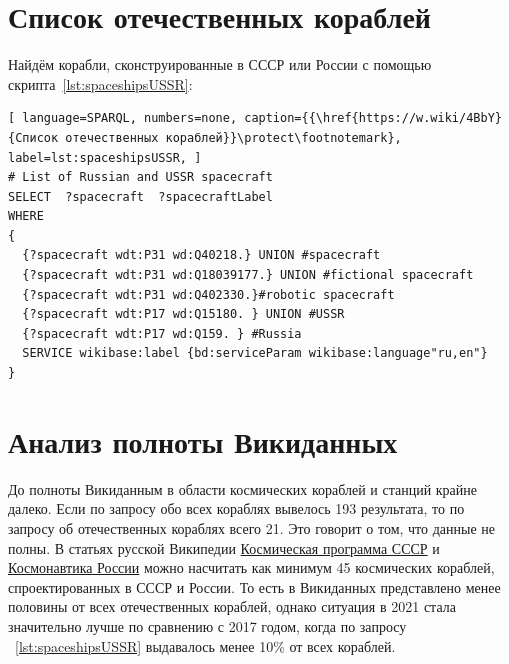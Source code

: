 \section{Список отечественных кораблей}
Найдём корабли, сконструированные в СССР или России с помощью скрипта~\ref{lst:spaceshipsUSSR}:

\begin{lstlisting}[ language=SPARQL, numbers=none, caption={{\href{https://w.wiki/4BbY}{Список отечественных кораблей}}\protect\footnotemark}, label=lst:spaceshipsUSSR, ]
# List of Russian and USSR spacecraft
SELECT  ?spacecraft  ?spacecraftLabel 
WHERE
{
  {?spacecraft wdt:P31 wd:Q40218.} UNION #spacecraft
  {?spacecraft wdt:P31 wd:Q18039177.} UNION #fictional spacecraft
  {?spacecraft wdt:P31 wd:Q402330.}#robotic spacecraft
  {?spacecraft wdt:P17 wd:Q15180. } UNION #USSR
  {?spacecraft wdt:P17 wd:Q159. } #Russia
  SERVICE wikibase:label {bd:serviceParam wikibase:language"ru,en"}
}
\end{lstlisting}

\section{Анализ полноты Викиданных}
До полноты Викиданным в области космических кораблей и станций крайне далеко. Если по запросу обо всех кораблях вывелось 193 результата, то по запросу об отечественных кораблях всего 21. Это говорит о том, что данные не полны. В статьях русской Википедии \href{https://ru.wikipedia.org/wiki/%D0%9A%D0%BE%D1%81%D0%BC%D0%B8%D1%87%D0%B5%D1%81%D0%BA%D0%B0%D1%8F_%D0%BF%D1%80%D0%BE%D0%B3%D1%80%D0%B0%D0%BC%D0%BC%D0%B0_%D0%A1%D0%A1%D0%A1%D0%A0}{Космическая программа СССР} и \href{https://ru.wikipedia.org/wiki/%D0%9A%D0%BE%D1%81%D0%BC%D0%BE%D0%BD%D0%B0%D0%B2%D1%82%D0%B8%D0%BA%D0%B0_%D0%A0%D0%BE%D1%81%D1%81%D0%B8%D0%B8}{Космонавтика России} можно насчитать как минимум 45 космических кораблей, спроектированных в СССР и России. То есть в Викиданных представлено менее половины от всех отечественных кораблей, однако ситуация в 2021 стала значительно лучше по сравнению с 2017 годом, когда по запросу ~\ref{lst:spaceshipsUSSR} выдавалось менее 10\% от всех кораблей. 

